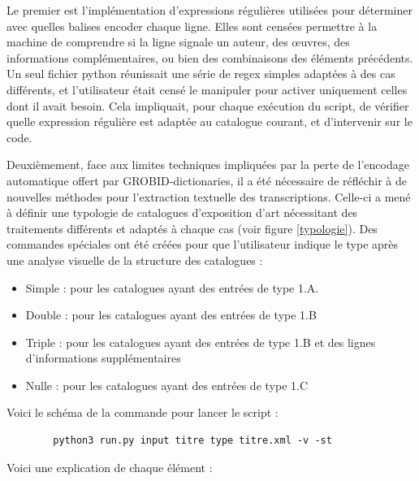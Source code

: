\documentclass[a4paper,12pt,twoside]{book}
\begin{document}
Le premier est l'implémentation d'expressions régulières utilisées pour déterminer avec quelles balises encoder chaque ligne. Elles sont censées permettre à la machine de comprendre si la ligne signale un auteur, des œuvres, des informations complémentaires, ou bien des combinaisons des éléments précédents. Un seul fichier python réunissait une série de regex simples adaptées à des cas différents, et l'utilisateur était censé le manipuler pour activer uniquement celles dont il avait besoin. Cela impliquait, pour chaque exécution du script, de vérifier quelle expression régulière est adaptée au catalogue courant, et d'intervenir sur le code.


Deuxièmement, face aux limites techniques impliquées par la perte de l'encodage automatique offert par GROBID-dictionaries, il a été nécessaire de réfléchir à de nouvelles méthodes pour l'extraction textuelle des transcriptions. Celle-ci a mené à définir une typologie de catalogues d'exposition d'art nécessitant des traitements différents et adaptés à chaque cas (voir figure \ref{typologie}). Des commandes spéciales ont été créées pour que l'utilisateur indique le type après une analyse visuelle de la structure des catalogues :\\
\begin{itemize}
	\item Simple : pour les catalogues ayant des entrées de type 1.A.
	\item Double : pour les catalogues ayant des entrées de type 1.B
	\item Triple : pour les catalogues ayant des entrées de type 1.B et des lignes d'informations supplémentaires
	\item Nulle : pour les catalogues ayant des entrées de type 1.C
\end{itemize}

Voici le schéma de la commande pour lancer le script :

\begin{normalsize}
	\begin{verbatim}
		python3 run.py input titre type titre.xml -v -st
	\end{verbatim}
\end{normalsize}

Voici une explication de chaque élément :
\end{document}
